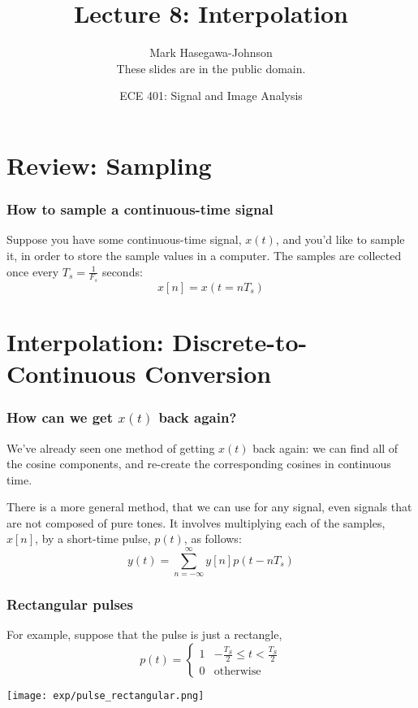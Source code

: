 \documentclass{beamer}
\title{Lecture 8: Interpolation}
\author{Mark Hasegawa-Johnson\\These slides are in the public domain.}
\date{ECE 401: Signal and Image Analysis}
\begin{document}
\begin{frame}
  \maketitle
\end{frame}

\begin{frame}
  \tableofcontents
\end{frame}

\section[Sampling]{Review: Sampling}
\setcounter{subsection}{1}

\begin{frame}
  \frametitle{How to sample a continuous-time signal}

  Suppose you have some continuous-time signal, $x(t)$, and you'd like
  to sample it, in order to store the sample values in a computer.
  The samples are collected once every $T_s=\frac{1}{F_s}$ seconds:
  \begin{displaymath}
    x[n] = x(t=nT_s)
  \end{displaymath}
\end{frame}

\section[Interpolation]{Interpolation: Discrete-to-Continuous Conversion}
\setcounter{subsection}{1}

\begin{frame}
  \frametitle{How can we get $x(t)$ back again?}

  We've already seen one method of getting $x(t)$ back again: we can
  find all of the cosine components, and re-create the corresponding
  cosines in continuous time.

  There is a more general method, that we can use for any signal, even
  signals that are not composed of pure tones.  It involves
  multiplying each of the samples, $x[n]$, by a short-time pulse,
  $p(t)$, as follows:
  \begin{displaymath}
    y(t) = \sum_{n=-\infty}^\infty y[n]p(t-nT_s)
  \end{displaymath}
\end{frame}

\begin{frame}
  \frametitle{Rectangular pulses}

  For example, suppose that the pulse is  just a  rectangle,
  \begin{displaymath}
    p(t) = \begin{cases}
      1 & -\frac{T_S}{2}\le t<\frac{T_S}{2}\\
      0 & \mbox{otherwise}
    \end{cases}
  \end{displaymath}

  \centerline{\texttt{[image: exp/pulse\_rectangular.png]}}  
\end{frame}
\end{document}
